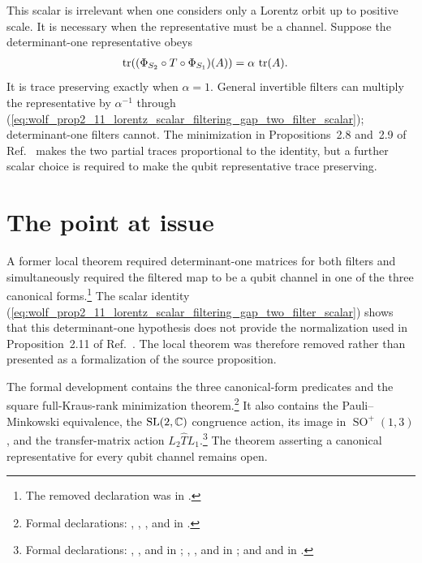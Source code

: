 \documentclass{article}
\begin{document}
This scalar is irrelevant when one considers only a Lorentz orbit up to
positive scale. It is necessary when the representative must be a channel.
Suppose the determinant-one representative obeys
\begin{align}
    \operatorname{tr}\!\left((\Phi_{S_2}\circ T\circ\Phi_{S_1})(A)\right)
        &=\alpha\,\operatorname{tr}(A).
    \label{eq:wolf_prop2_11_lorentz_scalar_filtering_gap_trace_scalar}
\end{align}
It is trace preserving exactly when $\alpha=1$. General invertible filters can
multiply the representative by $\alpha^{-1}$ through
(\ref{eq:wolf_prop2_11_lorentz_scalar_filtering_gap_two_filter_scalar});
determinant-one filters cannot. The minimization in Propositions~2.8 and~2.9
of Ref.~\cite{Wolf2012Quantum} makes the two partial traces proportional to
the identity, but a further scalar choice is required to make the qubit
representative trace preserving.

\section{The point at issue}

A former local theorem required determinant-one matrices for both filters and
simultaneously required the filtered map to be a qubit channel in one of the
three canonical forms.\footnote{The removed declaration was
 in
.}
The scalar identity
(\ref{eq:wolf_prop2_11_lorentz_scalar_filtering_gap_two_filter_scalar}) shows
that this determinant-one hypothesis does not provide the normalization used
in Proposition~2.11 of Ref.~\cite{Wolf2012Quantum}. The local theorem was
therefore removed rather than presented as a formalization of the source
proposition.

The formal development contains the three canonical-form predicates and the
square full-Kraus-rank minimization theorem.\footnote{Formal declarations:
,
,
, and
 in
.}
It also contains the Pauli--Minkowski equivalence, the
$\operatorname{SL}(2,\mathbb{C})$ congruence action, its image in
$\operatorname{SO}^{+}(1,3)$, and the transfer-matrix action
$L_2\widehat T L_1$.\footnote{Formal declarations:
,
, and
 in
;
,
, and
 in
; and
 and
 in
.}
The theorem asserting a canonical representative for every qubit channel
remains open.
\end{document}

